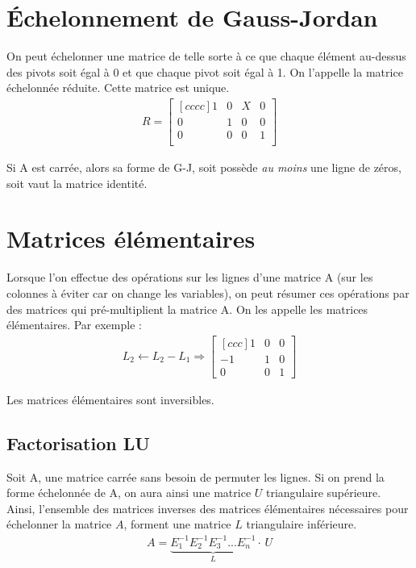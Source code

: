 \documentclass[a4paper]{book}
\begin{document}
\section{Échelonnement de Gauss-Jordan}
On peut échelonner une matrice de telle sorte à ce que chaque élément au-dessus des pivots soit égal à 0 et que chaque pivot soit égal à 1. On l'appelle la matrice échelonnée réduite. Cette matrice est unique.
\begin{gather}
    R = \begin{bmatrix}[cccc]
    1&0&X&0 \\
    0&1&0&0 \\
    0&0&0&1 \\
    \end{bmatrix}
\end{gather}
\begin{framed}
Si A est carrée, alors sa forme de G-J, soit possède \emph{au moins} une ligne de zéros, soit vaut la matrice identité.
\end{framed}
\section{Matrices élémentaires}
Lorsque l'on effectue des opérations sur les lignes d'une matrice A (sur les colonnes à éviter car on change les variables), on peut résumer ces opérations par des matrices qui pré-multiplient la matrice A. On les appelle les matrices élémentaires. Par exemple :
\begin{gather}
    L_2 \leftarrow L_2 - L_1 \Rightarrow 
    \begin{bmatrix}[ccc]
    1&0&0 \\ -1 & 1 & 0 \\ 0&0&1
    \end{bmatrix}
\end{gather}
\begin{framed}
Les matrices élémentaires sont inversibles.
\end{framed}
\subsection{Factorisation LU}
Soit A, une matrice carrée sans besoin de permuter les lignes. Si on prend la forme échelonnée de A, on aura ainsi une matrice $U$ triangulaire supérieure. Ainsi, l'ensemble des matrices inverses des matrices élémentaires nécessaires pour échelonner la matrice $A$, forment une matrice $L$ triangulaire inférieure.
\begin{gather}
    A = \underbrace{E_{1}^{-1}E_{2}^{-1}E_{3}^{-1}...E_{n}^{-1}}_{L}\cdot\, U
\end{gather}
\end{document}

